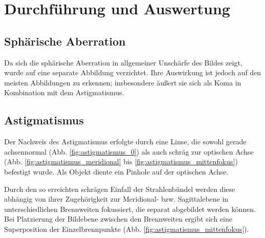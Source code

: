 \section{Durchführung und Auswertung}

\subsection{Sphärische Aberration}

Da sich die sphärische Aberration in allgemeiner Unschärfe des Bildes zeigt, wurde auf eine separate Abbildung verzichtet. Ihre Auswirkung ist jedoch auf den meisten Abbildungen zu erkennen; insbesondere äußert sie sich als Koma in Kombination mit dem Astigmatismus.

\subsection{Astigmatismus}

Der Nachweis des Astigmatismus erfolgte durch eine Linse, die sowohl gerade achsennormal (Abb. \ref{fig:astigmatismus_0}) als auch schräg zur optischen Achse (Abb. \ref{fig:astigmatismus_meridional} bis \ref{fig:astigmatismus_mittenfokus}) befestigt wurde. Als Objekt diente ein Pinhole auf der optischen Achse. 

Durch den so erreichten schrägen Einfall der Strahlenbündel werden diese abhängig von ihrer Zugehörigkeit zur Meridional- bzw. Sagittalebene in unterschiedlichen Brennweiten fokussiert, die separat abgebildet werden können. Bei Platzierung der Bildebene zwischen den Brennweiten ergibt sich eine Superposition der Einzelbrennpunkte (Abb. \ref{fig:astigmatismus_mittenfokus}).

